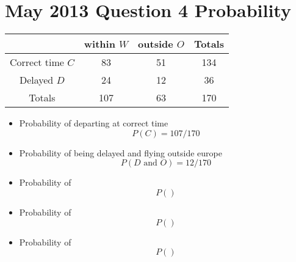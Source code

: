 \section*{May 2013 Question 4 Probability}
\begin{center}
\begin{tabular}{|c|c|c|c|}
\hline  & within $W$ & outside $O$ & Totals \\ 
\hline Correct time $C$ & 83 & 51 & 134 \\ 
\hline Delayed $D$ & 24 & 12 & 36 \\ 
\hline Totals & 107 & 63 & 170 \\ 
\hline 
\end{tabular} 
\end{center}\begin{itemize}
\item Probability of departing at correct time
\[P(C) = 107/170\]
\item Probability of being delayed and flying outside europe 
\[P(D  \mbox{ and } O) = 12/170\]
\item Probability of 
\[P() \]
\item Probability of 
\[P() \]
\item Probability of 
\[P() \]
\end{itemize}



